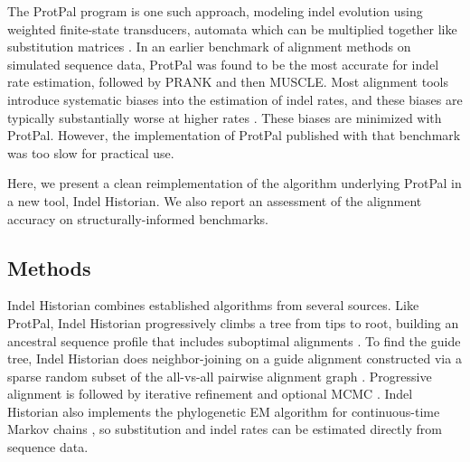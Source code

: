 \documentclass{bioinfo}
\begin{document}
The ProtPal program \citep{Westesson2012-zg} is one such approach, modeling indel evolution using 
weighted finite-state transducers,
automata which can be multiplied together like substitution matrices \citep{BouchardCote2013}.
In an earlier benchmark of alignment methods on simulated sequence data,
ProtPal was found to be the most accurate for indel rate estimation,
followed by PRANK and then MUSCLE.
Most alignment tools introduce systematic biases into the
estimation of indel rates, and these biases are typically substantially worse
at higher rates \citep{Westesson2012-zg}.
These biases are minimized with ProtPal.
However, the implementation of ProtPal published with that benchmark was too slow
for practical use.

Here, we present a clean reimplementation of the algorithm underlying ProtPal
in a new tool, Indel Historian.
We also report an assessment of the alignment accuracy %
on structurally-informed benchmarks.

\begin{methods}
\section{Methods}

Indel Historian combines established algorithms from several sources.
Like ProtPal, Indel Historian progressively climbs a tree from tips to root,
building an ancestral sequence profile that includes suboptimal alignments \citep{Westesson2012-zg}.
To find the guide tree, Indel Historian does neighbor-joining \citep{SaitouNei87}
on a guide alignment constructed via a sparse random subset of the all-vs-all pairwise alignment graph \citep{BradleyEtAl2009}.
Progressive alignment is followed by iterative refinement \citep{HolmesBruno2001,Edgar2004b} and optional MCMC \citep{WestessonBarquistHolmes2012}.
Indel Historian also implements the phylogenetic EM algorithm for continuous-time Markov chains \citep{HolmesRubin2002},
so substitution and indel rates can be estimated directly from sequence data.

\end{methods}
\end{document}
